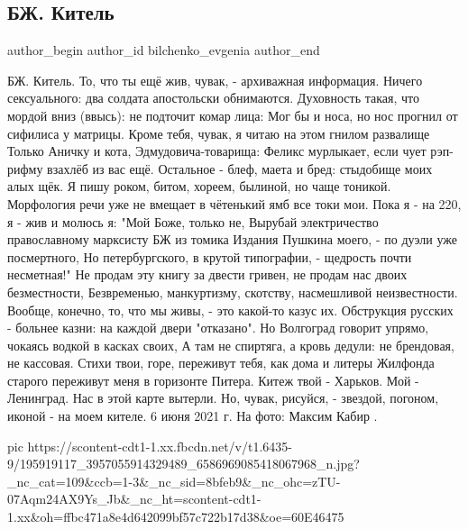  
 
 
 
 
 
\subsection{БЖ. Китель}
\label{sec:06_06_2021.fb.bilchenko_evgenia.1.kitel}
\ifcmt
 author_begin
   author_id bilchenko_evgenia
 author_end
\fi

БЖ. Китель.
То, что ты ещё жив, чувак, - архиважная информация.
Ничего сексуального: два солдата апостольски обнимаются.
Духовность такая, что мордой вниз (ввысь): не подточит комар лица:
Мог бы и носа, но нос прогнил от сифилиса у матрицы.
Кроме тебя, чувак, я читаю на этом гнилом развалище
Только Аничку и кота, Эдмудовича-товарища:
Феликс мурлыкает, если чует рэп-рифму взахлёб из вас ещё.
Остальное - блеф, маета и бред: стыдобище моих алых щёк.
Я пишу роком, битом, хореем, былиной, но чаще тоникой.
Морфология речи уже не вмещает в чётенький ямб все токи мои.
Пока я - на 220, я - жив и молюсь я: "Мой Боже, только не,
Вырубай электричество православному марксисту БЖ из томика
Издания Пушкина моего, - по дуэли уже посмертного,
Но петербургского, в крутой типографии, - щедрость почти несметная!"
Не продам эту книгу за двести гривен, не продам нас двоих безместности,
Безвременью, манкуртизму, скотству, насмешливой неизвестности.
Вообще, конечно, то, что мы живы, - это какой-то казус их.
Обструкция русских - больнее казни: на каждой двери "отказано".
Но Волгоград говорит упрямо, чокаясь водкой в касках своих,
А там не спиртяга, а кровь дедули: не брендовая, не кассовая.
Стихи твои, горе, переживут тебя, как дома и литеры
Жилфонда старого переживут меня в горизонте Питера.
Китеж твой - Харьков. Мой - Ленинград. Нас в этой карте вытерли.
Но, чувак, рисуйся, - звездой, погоном, иконой - на моем кителе.
6 июня 2021 г.
На фото: Максим Кабир .

\ifcmt
  pic https://scontent-cdt1-1.xx.fbcdn.net/v/t1.6435-9/195919117_3957055914329489_6586969085418067968_n.jpg?_nc_cat=109&ccb=1-3&_nc_sid=8bfeb9&_nc_ohc=zTU-07Aqm24AX9Ys_Jb&_nc_ht=scontent-cdt1-1.xx&oh=ffbc471a8e4d642099bf57c722b17d38&oe=60E46475
\fi
